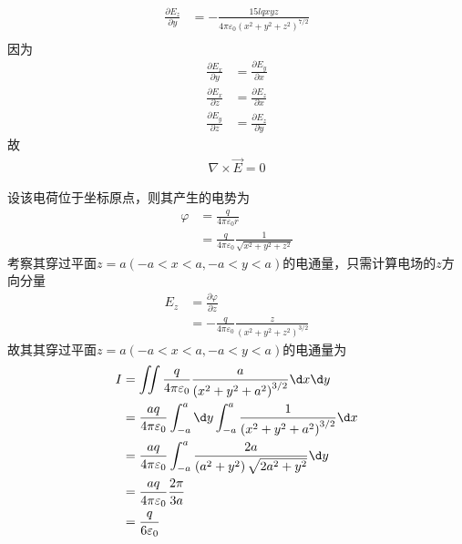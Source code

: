 \documentclass{phyasgn}
\begin{document}
\begin{sol}[2]
\begin{align*}
    \frac{\partial E_z}{\partial y}&=-\frac{15 l q x y z}{4\pi\varepsilon_0\left(x^2+y^2+z^2\right)^{7/2}}\\
  \end{align*}
  因为
  \begin{align*}
    \frac{\partial E_x}{\partial y}&=\frac{\partial E_y}{\partial x}\\
    \frac{\partial E_x}{\partial z}&=\frac{\partial E_z}{\partial x}\\
    \frac{\partial E_y}{\partial z}&=\frac{\partial E_z}{\partial y}
  \end{align*}
  故
  \begin{align*}
    \nabla\times\vec{E}=0
  \end{align*}
\end{sol}\par

\begin{sol}[3]
  设该电荷位于坐标原点，则其产生的电势为
  \begin{align*}
    \varphi&=\frac{q}{4\pi\varepsilon_0 r}\\
    &=\frac{q}{4\pi\varepsilon_0}\frac{1}{\sqrt{x^2+y^2+z^2}}
  \end{align*}
  考察其穿过平面$z=a(-a<x<a,-a<y<a)$的电通量，只需计算电场的$z$方向分量
  \begin{align*}
    E_z&=\frac{\partial \varphi}{\partial z}\\
    &=-\frac{q}{4\pi\varepsilon_0}\frac{z}{\left(x^2+y^2+z^2\right)^{3/2}}
  \end{align*}
  故其其穿过平面$z=a(-a<x<a,-a<y<a)$的电通量为
  \begin{align*}
    I&=\iint\frac{q}{4\pi\varepsilon_0}\frac{a}{\left(x^2+y^2+a^2\right)^{3/2}}\d x\d y\\
    &=\frac{aq}{4\pi\varepsilon_0}\int_{-a}^{a}\d y\int_{-a}^{a}\frac{1}{\left(x^2+y^2+a^2\right)^{3/2}}\d x\\
    &=\frac{aq}{4\pi\varepsilon_0}\int_{-a}^{a}\frac{2 a}{\left(a^2+y^2\right) \sqrt{2 a^2+y^2}}\d y\\
    &=\frac{aq}{4\pi\varepsilon_0}\frac{2 \pi }{3 a}\\
    &=\frac{q}{6\varepsilon_0}
  \end{align*}
\end{sol}\par
\end{document}
